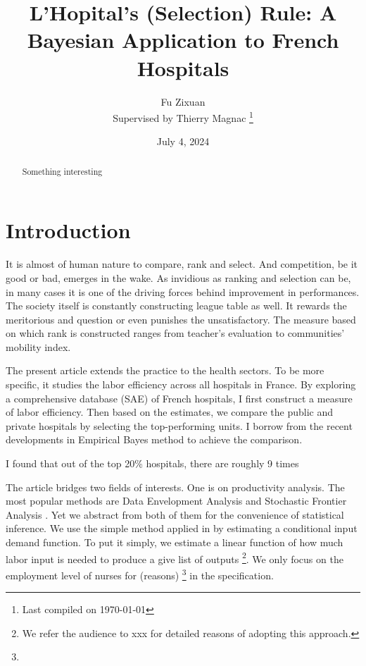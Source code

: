 \documentclass[12pt]{article}
\title{L'Hopital's (Selection) Rule: A Bayesian Application to French Hospitals}
\author{Fu Zixuan \\
    Supervised by Thierry Magnac \thanks{Last compiled on \today}}
\date{July 4, 2024}
\begin{document}
\maketitle

\begin{abstract}
    \noindent  Something interesting\\


    \bigskip
\end{abstract}

\newpage
\tableofcontents
\newpage

\section{Introduction}

It is almost of human nature to compare, rank and select. And competition, be
it good or bad, emerges in the wake. As invidious as ranking and selection can
be, in many cases it is one of the driving forces behind improvement in
performances. The society itself is constantly constructing league table as
well. It rewards the meritorious and question or even punishes the
unsatisfactory. The measure based on which rank is constructed ranges from
teacher's evaluation to communities' mobility index.

The present article extends the practice to the health sectors. To be more
specific, it studies the labor efficiency across all hospitals in France. By
exploring a comprehensive database (SAE) of French hospitals, I first construct
a measure of labor efficiency. Then based on the estimates, we compare the
public and private hospitals by selecting the top-performing units. I borrow
from the recent developments in Empirical Bayes method to achieve the
comparison.

I found that out of the top 20\% hospitals, there are roughly 9 times


The article bridges two fields of interests. One is on productivity analysis.
The most popular methods are Data Envelopment Analysis
\cite{charnes1978measuring} and Stochastic Frontier Analysis
\cite{aigner1977formulation,meeusen1977efficiency}. Yet we abstract from both
of them for the convenience of statistical inference. We use the simple method
applied in \cite{croiset2024hospitals} by estimating a conditional input demand
function. To put it simply, we estimate a linear function of how much labor
input is needed to produce a give list of outputs \footnote{We refer the
    audience to xxx for detailed reasons of adopting this approach.}. We only focus
on the employment level of nurses for (reasons) \footnote{} in the
specification.
\end{document}
